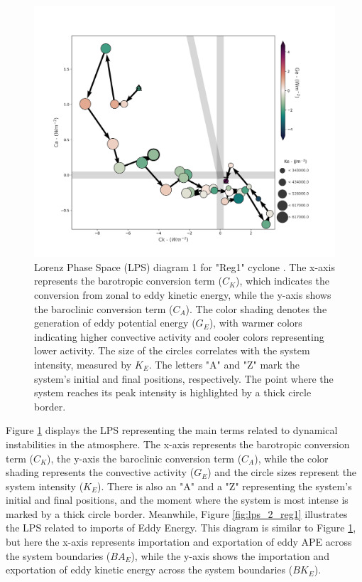 \begin{figure}[!htbp]
\centering
\includegraphics[width=\textwidth]{figs_6/lps-mixed_Reg1-Representative_NCEP-R2_fixed.png}
\caption[LPS 1 - "Reg1" Cyclone]{Lorenz Phase Space (LPS) diagram 1 for "Reg1" cyclone \citep{dias2011energy}. The x-axis represents the barotropic conversion term ($C_K$), which indicates the conversion from zonal to eddy kinetic energy, while the y-axis shows the baroclinic conversion term ($C_A$). The color shading denotes the generation of eddy potential energy ($G_E$), with warmer colors indicating higher convective activity and cooler colors representing lower activity. The size of the circles correlates with the system intensity, measured by $K_E$. The letters "A" and "Z" mark the system's initial and final positions, respectively. The point where the system reaches its peak intensity is highlighted by a thick circle border.}
\label{fig:lps_1_reg1}
\end{figure}

Figure \ref{fig:lps_1_reg1} displays the LPS representing the main terms related to dynamical instabilities in the atmosphere. The x-axis represents the barotropic conversion term ($C_K$), the y-axis the baroclinic conversion term ($C_A$), while the color shading represents the convective activity ($G_E$) and the circle sizes represent the system intensity ($K_E$). There is also an "A" and a "Z" representing the system's initial and final positions, and the moment where the system is most intense is marked by a thick circle border. Meanwhile, Figure \ref{fig:lps_2_reg1} illustrates the LPS related to imports of Eddy Energy. This diagram is similar to Figure \ref{fig:lps_1_reg1}, but here the x-axis represents importation and exportation of eddy APE across the system boundaries ($BA_E$), while the y-axis shows the importation and exportation of eddy kinetic energy across the system boundaries ($BK_E$). 

